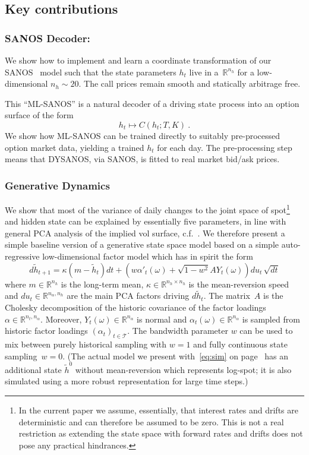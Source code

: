 \documentclass[11pt,a4paper]{article}
\newcommand{\R}{\mathbb{R}}
\begin{document}
\subsection*{Key contributions}


\subsubsection*{SANOS Decoder:}
    We show how to implement and learn a coordinate transformation of
    our SANOS~\cite{SANOS2026} model 
    such that the state parameters $h_t$ live in
    a~$\R^{n_h}$ for a low-dimensional $n_h\sim 20$. The call prices remain smooth and 
    statically arbitrage free.
    
    This ``ML-SANOS'' is a natural decoder of a driving state process into an option surface
    of the form
    $$
        h_t \longmapsto C(h_t;T,K)  \ .
    $$
    We show how ML-SANOS can be trained directly to suitably pre-processed 
    option market data, yielding a trained $h_t$ for each day.
    The pre-processing step means that DYSANOS, via SANOS, is fitted to real market bid/ask prices.
    
\subsubsection*{Generative Dynamics}
    We show that most of the variance of daily changes to the joint space of spot\footnote{
        In the current paper we assume, essentially, that interest rates and drifts
        are deterministic and can therefore be assumed to be zero. This is not a real
        restriction as extending the state space with forward rates and drifts
        does not pose any practical hindrances.
    } and
    hidden state can be explained by essentially five parameters, in line with general PCA analysis of the implied vol surface, c.f.~\cite{ContVol}.    
    We therefore present a simple baseline version of a generative
    state space model based on a simple auto-regressive low-dimensional factor model which
    has in spirit the form
    \begin{equation}\label{eq:dh_intro}
        d\tilde h_{t+1} =  \kappa(m-\tilde h_t)dt + \left( w \alpha'_t(\omega)  + \sqrt{1-w^2} A Y_t(\omega) \right)du_t\,\sqrt{dt} 
    \end{equation}
    where $m\in\R^{n_h}$ is the long-term mean, $\kappa \in \R^{n_h\times n_h}$
    is the mean-reversion speed and 
    $du_t\in\R^{n_\alpha, n_h}$ are the main PCA factors driving $d\tilde h_t$. The matrix~$A$ is the Cholesky
    decomposition of the historic covariance of the factor loadings~$\alpha\in \R^{n_t,n_\alpha}$.
    Moreover, $Y_t(\omega)\in \R^{n_\alpha}$ is normal and 
    $\alpha_t(\omega)\in \R^{n_\alpha}$
    is sampled from historic factor loadings $(\alpha_t)_{t\in\mathcal{T}}$. The
    bandwidth parameter $w$ can be used to mix between purely historical sampling with $w=1$ 
    and fully continuous state sampling~$w=0$. (The actual model
    we  present with~\eqref{eq:sim} on page~\pageref{eq:sim} has an additional state $\tilde h^0$ without mean-reversion
    which represents log-spot; it is also simulated using
    a more robust representation for large time steps.)
    
\end{document}
